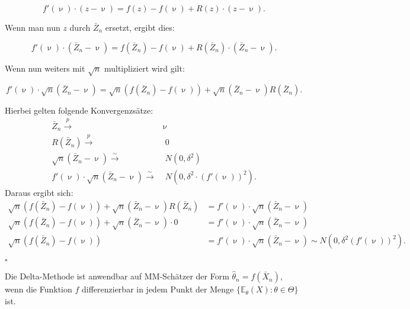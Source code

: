 \documentclass[10pt]{article}
\newcommand{\EW}{\mathbb{E}} %
\newcommand{\KW}{\overset{p} \longrightarrow} %
\newcommand{\KV}{\overset{\sim} \longrightarrow} %
\newenvironment{BWS}[1][]
{\begin{Beweis}[frametitle=#1]}{\end{Beweis}}
\begin{document}
\begin{BWS}[Beweis 1.3.1 Delta-Methode]
		\begin{equation*}
			f'(\upnu) \cdot (z-\upnu) = f(z) - f(\upnu) + R(z) \cdot (z-\upnu).
		\end{equation*}
		
		Wenn man nun $z$ durch $\bar{Z}_n$ ersetzt, ergibt dies:
		
		
		\begin{equation*}
			f'(\upnu) \cdot (\bar{Z}_n-\upnu) = f(\bar{Z}_n) - f(\upnu) + R(\bar{Z}_n) \cdot (\bar{Z}_n-\upnu).			
		\end{equation*}
		
		Wenn nun weiters mit $\sqrt{n}$ multipliziert wird gilt:
		
		\begin{equation*}
			f'(\upnu) \cdot\sqrt{n} (\bar{Z}_n-\upnu) = \sqrt{n}(f(\bar{Z}_n) - f(\upnu)) + \sqrt{n} (\bar{Z}_n-\upnu)	R(\bar{Z}_n).
		\end{equation*}
		
		Hierbei gelten folgende Konvergenzsätze:
		\begin{equation*}
			\begin{split}
			\bar{Z}_n \KW& \upnu\\
			R(\bar{Z}_n) \KW& \;0\\
			\sqrt{n} (\bar{Z}_n-\upnu) \KV& \;N(0,\delta^2)\\
			f'(\upnu) \cdot\sqrt{n} (\bar{Z}_n-\upnu) \KV& \;N(0,\delta^2 \cdot (f'(\upnu))^2).
			\end{split}
		\end{equation*}
		Daraus ergibt sich: 
		\begin{equation*}
			\begin{split}
				\sqrt{n}(f(\bar{Z}_n) - f(\upnu)) + \sqrt{n} (\bar{Z}_n-\upnu)	R(\bar{Z}_n) &= f'(\upnu) \cdot\sqrt{n} (\bar{Z}_n-\upnu) \\
				\sqrt{n}(f(\bar{Z}_n) - f(\upnu)) + \sqrt{n} (\bar{Z}_n-\upnu) \cdot 0 &= f'(\upnu) \cdot\sqrt{n} (\bar{Z}_n-\upnu) \\
				\sqrt{n} (f(\bar{Z}_n) - f(\upnu)) &= f'(\upnu) \cdot \sqrt{n} (\bar{Z}_n - \upnu) \sim N(0, \delta^2 (f'(\upnu))^2).
			\end{split}
		\end{equation*}
		\begin{flushright}
			$\square$
		\end{flushright}
		
	\end{BWS}
	
	\noindent Die Delta-Methode ist anwendbar auf MM-Schätzer der Form $\hat{\theta}_n = f(\bar{X}_n)$, wenn die Funktion $f$ differenzierbar in jedem Punkt der Menge $\{\EW_\theta(X) : \theta \in \Theta\}$ ist.
	
\end{document}
